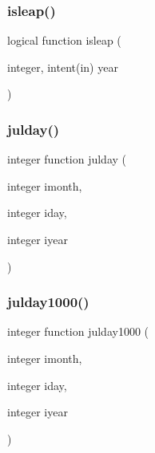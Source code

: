 \mbox{\label{dateutils_8f90_acbfdb1c78beb593447108203011b380c}} 
\subsubsection{\texorpdfstring{isleap()}{isleap()}}
{\footnotesize\ttfamily logical function isleap (\begin{DoxyParamCaption}\item[{integer, intent(in)}]{year }\end{DoxyParamCaption})}

\mbox{\label{dateutils_8f90_ab4306c1f20ef02cf582fb1050fa0c5d9}} 
\subsubsection{\texorpdfstring{julday()}{julday()}}
{\footnotesize\ttfamily integer function julday (\begin{DoxyParamCaption}\item[{integer}]{imonth,  }\item[{integer}]{iday,  }\item[{integer}]{iyear }\end{DoxyParamCaption})}

\mbox{\label{dateutils_8f90_a9e268003476faf6e3551f0b04714231a}} 
\subsubsection{\texorpdfstring{julday1000()}{julday1000()}}
{\footnotesize\ttfamily integer function julday1000 (\begin{DoxyParamCaption}\item[{integer}]{imonth,  }\item[{integer}]{iday,  }\item[{integer}]{iyear }\end{DoxyParamCaption})}

